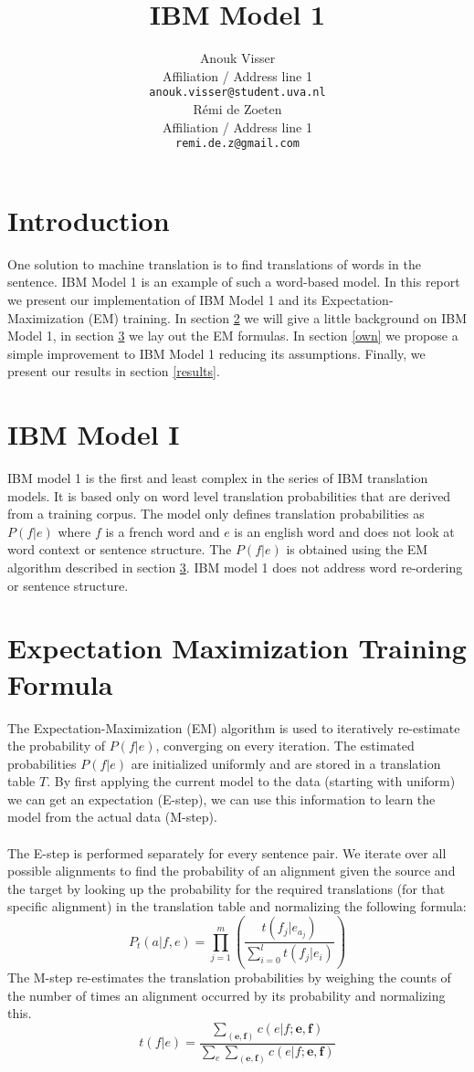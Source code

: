 \documentclass[11pt]{article}
\title{IBM Model 1}
\author{Anouk Visser \\
  Affiliation / Address line 1 \\
  {\tt anouk.visser@student.uva.nl} \\\And
  R\'emi de Zoeten \\
  Affiliation / Address line 1 \\
  {\tt remi.de.z@gmail.com} \\}
\date{}
\begin{document}
\maketitle

\section{Introduction}
One solution to machine translation is to find translations of words in the sentence. IBM Model 1 is an example of such a word-based model. In this report we present our implementation of IBM Model 1 and its Expectation-Maximization (EM) training. In section \ref{IBM} we will give a little background on IBM Model 1, in section \ref{em} we lay out the EM formulas. In section \ref{own} we propose a simple improvement to IBM Model 1 reducing its assumptions. Finally, we present our results in section \ref{results}.


\section{IBM Model I}
\label{IBM}
IBM model 1 is the first and least complex in the series of IBM translation models. It is based only on word level translation probabilities that are derived from a training corpus. The model only defines translation probabilities as $P(f|e)$ where $f$ is a french word and $e$ is an english word and does not look at word context or sentence structure. The $P(f|e)$ is obtained using the EM algorithm described in section \ref{em}. IBM model 1 does not address word re-ordering or sentence structure.

\section{Expectation Maximization Training Formula}
\label{em}
The Expectation-Maximization (EM) algorithm is used to iteratively re-estimate the probability of $P(f|e)$, converging on every iteration. The estimated probabilities $P(f|e)$ are initialized uniformly and are stored in a translation table $T$. By first applying the current model to the data (starting with uniform) we can get an expectation (E-step), we can use this information to learn the model from the actual data (M-step).\\\\
The E-step is performed separately for every sentence pair. We iterate over all possible alignments to find the probability of an alignment given the source and the target by looking up the probability for the required translations (for that specific alignment) in the translation table and normalizing the following formula: 
$$P_t(a|f, e) = \prod\limits_{j=1}^{m} (\frac{t(f_j|e_{a_{j}})}{\sum\limits_{i=0}^{l}t(f_j|e_i)})$$
The M-step re-estimates the translation probabilities by weighing the counts of the number of times an alignment occurred by its probability and normalizing this. 
$$t(f|e) = \frac{\sum\limits_{(\textbf{e}, \textbf{f})} c(e|f; \textbf{e}, \textbf{f})}{\sum\limits_{e}\sum\limits_{(\textbf{e}, \textbf{f})} c(e|f; \textbf{e}, \textbf{f})}$$
\end{document}
